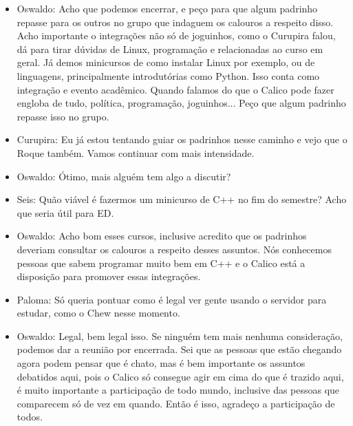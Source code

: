 \documentclass{ata-calico}
\begin{document}
\begin{itemize}
\item Oswaldo: Acho que podemos encerrar, e peço para que algum padrinho repasse para os outros no grupo que indaguem os calouros a respeito disso. Acho importante o integrações não só de joguinhos, como o Curupira falou, dá para tirar dúvidas de Linux, programação e relacionadas ao curso em geral. Já demos minicursos de como instalar Linux por exemplo, ou de linguagens, principalmente introdutórias como Python. Isso conta como integração e evento acadêmico. Quando falamos do que o Calico pode fazer engloba de tudo, política, programação, joguinhos... Peço que algum padrinho repasse isso no grupo.

\item Curupira: Eu já estou tentando guiar os padrinhos nesse caminho e vejo que o Roque também. Vamos continuar com mais intensidade.

\item Oswaldo: Ótimo, mais alguém tem algo a discutir?

\item Seis: Quão viável é fazermos um minicurso de C++ no fim do semestre? Acho que seria útil para ED.

\item Oswaldo: Acho bom esses cursos, inclusive acredito que os padrinhos deveriam consultar os calouros a respeito desses assuntos. Nós conhecemos pessoas que sabem programar muito bem em C++ e o Calico está a disposição para promover essas integrações.

\item Paloma: Só queria pontuar como é legal ver gente usando o servidor para estudar, como o Chew nesse momento.

\item Oswaldo: Legal, bem legal isso. Se ninguém tem mais nenhuma consideração, podemos dar a reunião por encerrada. Sei que as pessoas que estão chegando agora podem pensar que é chato, mas é bem importante os assuntos debatidos aqui, pois o Calico só consegue agir em cima do que é trazido aqui, é muito importante a participação de todo mundo, inclusive das pessoas que comparecem só de vez em quando. Então é isso, agradeço a participação de todos.

\end{itemize}

\end{document}
